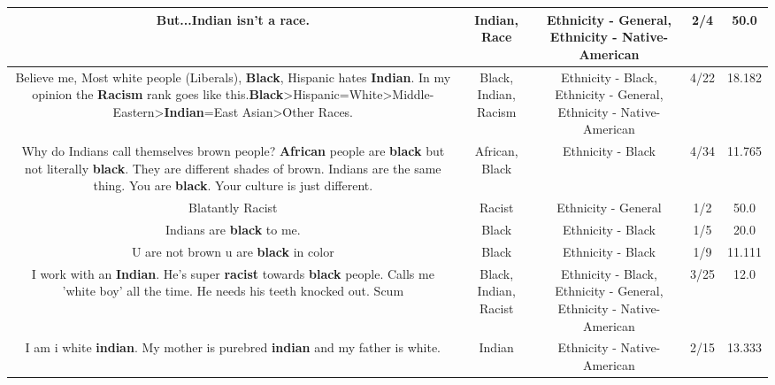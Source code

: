 \documentclass[11pt]{article}
\newlength\mylength
\begin{document}
\begin{center}
\begin{longtable}{|C{.65\mylength}|C{.30\mylength}|C{.12\mylength}|C{.12\mylength}|C{.12\mylength}|}
  \small But...\textbf{Indian} isn't a \textbf{race}.\normalsize   & Indian, Race & Ethnicity - General, Ethnicity - Native-American & 2/4 & 50.0 \\  \hline
  \small Believe me, Most white people (Liberals), \textbf{Black}, Hispanic hates \textbf{Indian}. In my opinion the \textbf{Racism} rank goes like this.\textbf{Black}>Hispanic=White>Middle-Eastern>\textbf{Indian}=East Asian>Other Races.\normalsize   & Black, Indian, Racism & Ethnicity - Black, Ethnicity - General, Ethnicity - Native-American & 4/22 & 18.182 \\  \hline
  \small Why do Indians call themselves brown people? \textbf{African} people are \textbf{black} but not literally \textbf{black}. They are different shades of brown. Indians are the same thing. You are \textbf{black}. Your culture is just different.\normalsize   & African, Black & Ethnicity - Black & 4/34 & 11.765 \\  \hline
  \small Blatantly Racist\normalsize   & Racist & Ethnicity - General & 1/2 & 50.0 \\  \hline
  \small Indians are \textbf{black} to me.\normalsize   & Black & Ethnicity - Black & 1/5 & 20.0 \\  \hline
  \small U are not brown u are \textbf{black} in color\normalsize   & Black & Ethnicity - Black & 1/9 & 11.111 \\  \hline
  \small I work with an \textbf{Indian}.  He's super \textbf{racist} towards \textbf{black} people.   Calls me 'white boy' all the time.   He needs his teeth knocked out.  Scum\normalsize   & Black, Indian, Racist & Ethnicity - Black, Ethnicity - General, Ethnicity - Native-American & 3/25 & 12.0 \\  \hline
  \small I am i white \textbf{indian}. My mother is purebred \textbf{indian} and my father is white.\normalsize   & Indian & Ethnicity - Native-American & 2/15 & 13.333 \\  \hline

\end{longtable}
\end{center}
\end{document}
